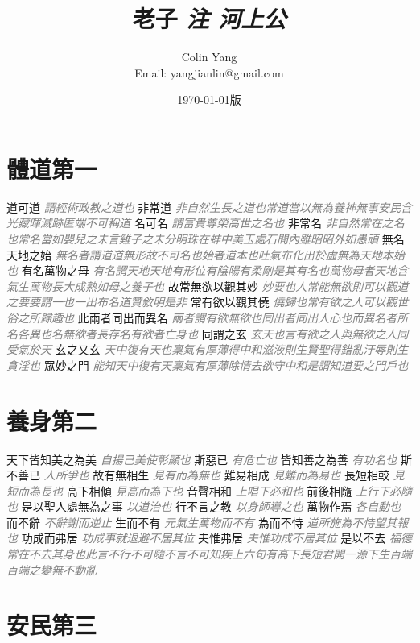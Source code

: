 \documentclass[a4paper,zihao=-4,oneside,landscape,UTF8]{ctexart}
\title{\textbf{老子}\textit{ 注 \hspace{5em}河上公}\hfil}
\author{Colin Yang \\Email: yangjianlin@gmail.com}
\date{\normalsize\today 版}
\newcommand{\zhushi}[1]{\scriptsize{\textit{\textcolor{gray}{#1}}}\normalsize}
\begin{document}
\large

\maketitle


\section{體道第一}


道可道
\zhushi{謂經術政教之道也}
非常道
\zhushi{非自然生長之道也常道當以無為養神無事安民含光藏暉滅跡匿端不可稱道}
名可名
\zhushi{謂富貴尊榮高世之名也}
非常名
\zhushi{非自然常在之名也常名當如嬰兒之未言雞子之未分明珠在蚌中美玉處石間內雖昭昭外如愚頑}
無名天地之始
\zhushi{無名者謂道道無形故不可名也始者道本也吐氣布化出於虛無為天地本始也}
有名萬物之母
\zhushi{有名謂天地天地有形位有陰陽有柔剛是其有名也萬物母者天地含氣生萬物長大成熟如母之養子也}
故常無欲以觀其妙
\zhushi{妙要也人常能無欲則可以觀道之要要謂一也一出布名道贊敘明是非}
常有欲以觀其僥
\zhushi{僥歸也常有欲之人可以觀世俗之所歸趣也}
此兩者同出而異名
\zhushi{兩者謂有欲無欲也同出者同出人心也而異名者所名各異也名無欲者長存名有欲者亡身也}
同謂之玄
\zhushi{玄天也言有欲之人與無欲之人同受氣於天}
玄之又玄
\zhushi{天中復有天也稟氣有厚薄得中和滋液則生賢聖得錯亂汙辱則生貪淫也}
眾妙之門
\zhushi{能知天中復有天稟氣有厚薄除情去欲守中和是謂知道要之門戶也}


\section{養身第二}

天下皆知美之為美
\zhushi{自揚己美使彰顯也}
斯惡已
\zhushi{有危亡也}
皆知善之為善
\zhushi{有功名也}
斯不善已
\zhushi{人所爭也}
故有無相生
\zhushi{見有而為無也}
難易相成
\zhushi{見難而為易也}
長短相較
\zhushi{見短而為長也}
高下相傾
\zhushi{見高而為下也}
音聲相和
\zhushi{上唱下必和也}
前後相隨
\zhushi{上行下必隨也}
是以聖人處無為之事
\zhushi{以道治也}
行不言之教
\zhushi{以身師導之也}
萬物作焉
\zhushi{各自動也}
而不辭
\zhushi{不辭謝而逆止}
生而不有
\zhushi{元氣生萬物而不有}
為而不恃
\zhushi{道所施為不恃望其報也}
功成而弗居
\zhushi{功成事就退避不居其位}
夫惟弗居
\zhushi{夫惟功成不居其位}
是以不去
\zhushi{福德常在不去其身也此言不行不可隨不言不可知疾上六句有高下長短君開一源下生百端百端之變無不動亂}


\section{安民第三}
\end{document}
